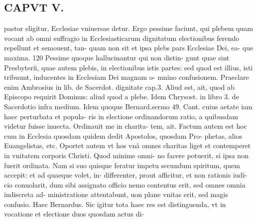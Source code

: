 \documentclass{article}
\begin{document}
\begin{pages}
\section*{CAPVT V. }
\marginpar{[ p.349 ]}\pstart pastor eligitur, Ecclesiae vniuersae detur. Ergo pessime faciunt, qui plebem quam vocant ab omni suffragio in Ecclesiasticarum dignitatum electionibus ferendo repellunt et semouent, tan- quam non sit et ipsa plebs pars Ecclesiae Dei, ea- que maxima. 120 Pessime quoque hallucinantur qui non distin- gunt quae sint Presbyterii, quae autem plebis, in electionibus istis partes: sed quod est illius, isti tribuunt, inducentes in Ecclesiam Dei magnam o- mnino confusionem. Praeclare enim Ambrosius in lib.  de Sacerdot. dignitate cap.3. Aliud est, ait, quod ab Episcopo requirit Dominus: aliud quod a plebe. Idem Chrysost. in libro 3. de Sacerdotio infra medium. Idem quoque Bernard.sermo 49. Cant. cuius aetate iam haec perturbata et popula- ris in electione ordinandorum ratio, a quibusdam videtur fuisse inuecta. Ordinauit me in charita- tem, ait. Factum autem est hoc cum in Ecclesia quosdam quidem dedit Apostolos, quosdam Pro- phetas, alios Euangelistas, etc. Oportet autem vt hos vnâ omnes charitas liget et contemperet in vnitatem corporis Christi. Quod minime omni- no facere potuerit, si ipsa non fuerit ordinata. Nam si suo quisque feratur impetu secundum spiritum, quem accepit: et ad quaeque volet, in- differenter, prout afficitur, et non rationis iudi- cio conuolarit, dum sibi assignato officio nemo contentus erit, sed omnes omnia indiscreta ad- ministratione attentabunt, uon plane vnitas erit, sed magis confusio. Haec Bernardus. Sic igitur tota haec res est distinguenda, vt in vocatione et electione duos quosdam actus di-  \pend

\end{pages}
\end{document}

